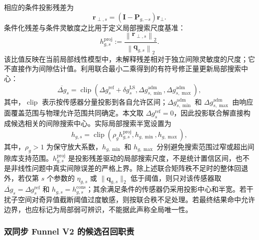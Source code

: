 \documentclass[UTF8,12pt,a4paper]{ctexart}
\begin{document}
相应的条件投影残差为
\begin{equation}
\bm r_{\perp,s}
=\left(\bm I-\bm P_{g,-s}\right)\bm r_{\perp}.
\label{eq:conditional_gap_residual}
\end{equation}
条件化残差与条件灵敏度之比用于定义局部搜索尺度基准：
\begin{equation}
 h_{g,s}^{\mathrm{proj}}
:=\frac{\left\lVert\bm r_{\perp,s}\right\rVert_2}
{\left\lVert\bm q_{g,s}\right\rVert_2}.
\label{eq:gap_bound}
\end{equation}
该比值反映在当前局部线性模型中，未解释残差相对于独立间隙灵敏度的尺度；它不直接作为间隙估计值。利用联合最小二乘得到的有符号修正量更新局部搜索中心：
\begin{equation}
\overline{\Delta g}_s
=\operatorname{clip}\!\left(
\Delta g_s^{\mathrm{ref}}
+\delta g_s^{\mathrm{LS}},
\Delta g_{s,\min}^{\mathrm{adm}},
\Delta g_{s,\max}^{\mathrm{adm}}
\right),
\label{eq:gap_center}
\end{equation}
其中，$\operatorname{clip}$ 表示按传感器分量投影到各自允许区间；$\Delta g_{s,\min}^{\mathrm{adm}}$ 和 $\Delta g_{s,\max}^{\mathrm{adm}}$ 由响应面覆盖范围与物理允许范围共同确定。本文取 $\Delta g_s^{\mathrm{ref}}=0$，因此投影联合解直接构成候选相关的间隙搜索中心。实际局部搜索半宽设置为
\begin{equation}
h_{g,s}
=\operatorname{clip}\!\left(
\rho_g h_{g,s}^{\mathrm{proj}},
h_{g,\min},
h_{g,\max}
\right),
\label{eq:local_range}
\end{equation}
其中，$\rho_g>1$ 为保守放大系数，$h_{g,\min}$ 和 $h_{g,\max}$ 分别避免搜索范围过窄或超出间隙库支持范围。$h_{g,s}^{\mathrm{proj}}$ 是投影残差驱动的局部搜索尺度，不是统计置信区间，也不是非线性问题中真实间隙误差的严格上界。除上述联合矩阵秩不足时的整体回退外，若仅第 $s$ 个参数的 $\eta_{g,s}$ 或 $\|\bm q_{g,s}\|_2$ 低于阈值，则只对该传感器取 $\overline{\Delta g}_s=\Delta g_s^{\mathrm{ref}}$ 和 $h_{g,s}=h_{g,s}^{\mathrm{cons}}$；其余满足条件的传感器仍采用投影中心和半宽。若干扰子空间对奇异值截断阈值过度敏感，则按联合秩不足处理。若最终结果命中允许边界，也应标记为局部弱可辨识，不能据此声称全局唯一性。

\subsubsection{双同步 Funnel V2 的候选召回职责}
\end{document}
